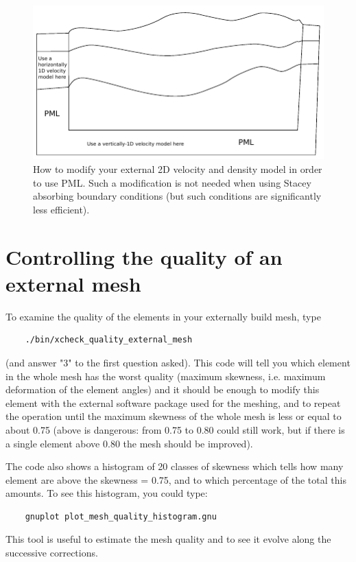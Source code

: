 \begin{figure}[htbp]
\centering
\includegraphics[width=6in]{figures/how_to_use_PML_with_external_velocity_model.pdf}
\caption{How to modify your external 2D velocity and density model in order to use PML.
Such a modification is not needed when using Stacey absorbing boundary conditions (but such conditions
are significantly less efficient).}
\label{fig:modify_external_velocity_model_to_use_PML}
\end{figure}

\section{Controlling the quality of an external mesh}

To examine the quality of the elements in your externally build mesh, type
%
\begin{verbatim}
    ./bin/xcheck_quality_external_mesh
\end{verbatim}
%
(and answer "3" to the first question asked).
This code will tell you which element in the whole mesh has the worst quality (maximum skewness, i.e. maximum deformation of the element angles) and it should be enough to modify this element with the external software package used for the meshing, and
to repeat the operation until the maximum skewness of the whole mesh is less or equal to about 0.75 (above is dangerous: from 0.75 to 0.80 could still work, but if there is a single element above 0.80 the mesh should be improved).

The code also shows a histogram of 20 classes of skewness which tells how many element are above the skewness = 0.75, and to which percentage of the total this amounts. To see this histogram, you could type:
%
\begin{verbatim}
    gnuplot plot_mesh_quality_histogram.gnu
\end{verbatim}
%
This tool is useful to estimate the mesh quality and to see it evolve along the successive corrections.

